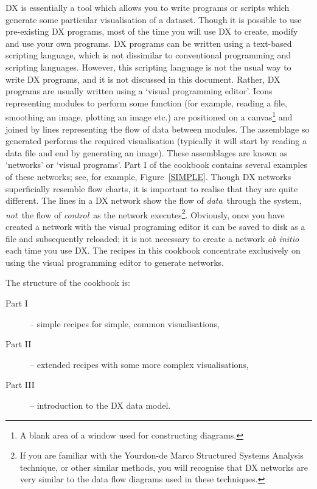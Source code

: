 \documentclass[twoside,11pt]{article}
\begin{document}
DX is essentially a tool which allows you to write programs or scripts
which generate some particular visualisation of a dataset. Though it is
possible to use pre-existing DX programs, most of the time you will use
DX to create, modify and use your own programs. DX programs can be
written using a text-based scripting language, which is not dissimilar
to conventional programming and scripting languages. However, this
scripting language is not the usual way to write DX programs, and it is
not discussed in this document. Rather, DX programs are usually written
using a `visual programming editor'. Icons representing modules to perform
some function (for example, reading a file, smoothing an image, plotting an
image etc.) are positioned on a canvas\footnote{A blank area of a window
used for constructing diagrams.} and joined by lines representing the
flow of data between modules. The assemblage so generated performs the
required visualisation (typically it will start by reading a data file
and end by generating an image). These assemblages are known as
`networks' or `visual programs'. Part I of the cookbook contains
several examples of these networks; see, for example,
Figure~\ref{SIMPLE}. Though DX networks superficially resemble flow
charts, it is important to realise that they are quite different. The
lines in a DX network show the flow of {\it data}\, through the system,
{\it not}\, the flow of {\it control}\, as the network
executes\footnote{If you are familiar with the Yourdon-de Marco
Structured Systems Analysis technique, or other similar methods, you
will recognise that DX networks are very similar to the data flow
diagrams used in these techniques.}. Obviously, once you have created a
network with the visual programing editor it can be saved to disk as a
file and subsequently reloaded; it is not necessary to create a network
{\it ab initio}\, each time you use DX. The recipes in this cookbook
concentrate exclusively on using the visual programming editor to generate
networks.

The structure of the cookbook is:

\begin{description}

  \item[{\rm Part I}] -- simple recipes for simple, common visualisations,

  \item[{\rm Part II}] -- extended recipes with some more complex
   visualisations,

  \item[{\rm Part III}] -- introduction to the DX data model.

\end{description}
\end{document}
